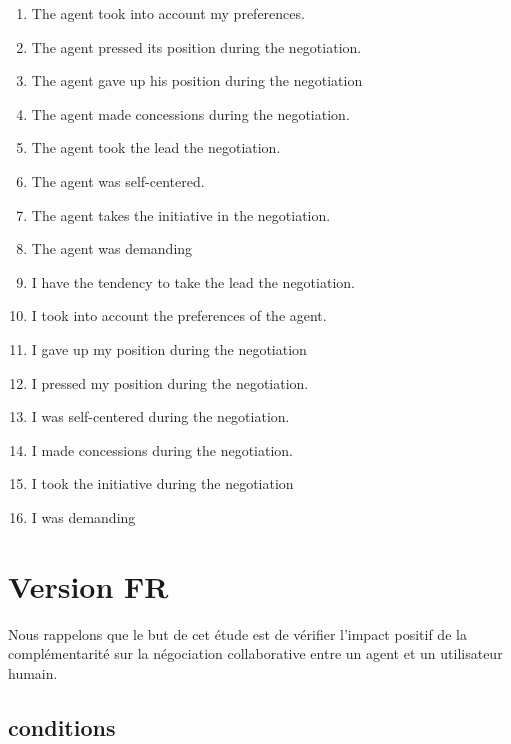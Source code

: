 \documentclass [french]{paper}
\begin{document}
\begin{enumerate}
			
			
			
			\item The agent took into account my preferences.
			\item The agent pressed its position during the negotiation.
			\item The agent gave up his position during the negotiation
			\item The agent made concessions during the negotiation.
			\item The agent took the lead the negotiation.
			\item The agent was self-centered.
			\item The agent takes the initiative in the negotiation.
			\item The agent was demanding
			
			\item I have the tendency to take the lead the negotiation.
			\item I took into account the preferences of the agent.
			\item I gave up my position during the negotiation
			\item I pressed my position during the negotiation.
			\item I was self-centered during the negotiation.
			\item I made concessions during the negotiation.
			\item I took the initiative during the negotiation
			\item I was demanding
			
				
		\end{enumerate}
		
\section{Version FR}
	Nous rappelons que le but de cet étude est de vérifier l'impact positif de la complémentarité sur la négociation collaborative entre un agent et un utilisateur humain. 
	
	\subsection{conditions}
	
\end{document}
